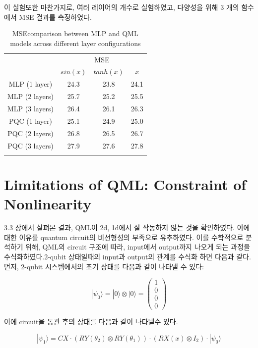 이 실험또한 마찬가지로, 여러 레이어의 개수로 실험하였고, 다양성을 위해 3 개의 함수에서 MSE  결과를 측정하였다.
\begin{table}[ht]
    \centering
    \begin{tabular}{c|ccc}
    \Xhline{3\arrayrulewidth}
    \multirow{2}{*}{Layers} & \multicolumn{3}{c}{MSE} \\
    \cline{2-4}
    & $sin(x)$  & $tanh(x)$ & $x$ \\
    \hline
    MLP (1 layer) & 24.3 & 23.8 & 24.1 \\
    MLP (2 layers) & 25.7 & 25.2 & 25.5 \\
    MLP (3 layers) & 26.4 & 26.1 & 26.3 \\
    \hline
    PQC (1 layer) & 25.1 & 24.9 & 25.0 \\
    PQC (2 layers) & 26.8 & 26.5 & 26.7 \\
    PQC (3 layers) & 27.9 & 27.6 & 27.8 \\
    \Xhline{3\arrayrulewidth}
    \end{tabular}
    \caption{MSEcomparison between MLP and QML models across different layer configurations}
    \label{tab:mse_comparison}
\end{table}




\section{Limitations of QML: Constraint of Nonlinearity}

3.3 장에서 살펴본 결과, QML이 2d, 1d에서 잘 작동하지 않는 것을 확인하였다. 이에 대한 이유를 quantum circuit의 비선형성의 부족으로 유추하였다. 이를 수학적으로 분석하기 위해, QML의 circuit 구조에 따라, input에서 output까지 나오게 되는 과정을 수식화하였다.2-qubit 상태일때의 input과 output의 관계를 수식화 하면 다음과 같다.
먼저, 2-qubit 시스템에서의 초기 상태를 다음과 같이 나타낼 수 있다:

\[
|\psi_0\rangle = |0\rangle \otimes |0\rangle = \begin{pmatrix} 1 \\ 0 \\ 0 \\ 0 \end{pmatrix}
\]

이에  circuit을 통관 후의 상태를 다음과 같이 나타낼수 있다.

\[
|\psi_1\rangle = CX \cdot (RY(\theta_2) \otimes RY(\theta_1)) \cdot (RX(x) \otimes I_2) \cdot |\psi_0\rangle
\]

